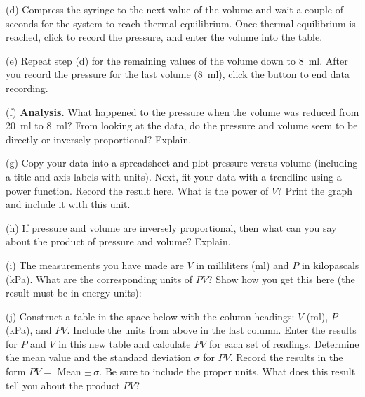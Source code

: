 (d) Compress the syringe to the next value of the volume 
and wait a couple of seconds for the system to reach thermal equilibrium. Once 
thermal equilibrium is reached, click  to record the pressure, and enter the volume into the table.

(e) Repeat step (d) for the remaining values of the volume down to 8~ml.  After you record
the pressure for the last volume (8~ml), click the  button to end data recording.

(f) \textbf{Analysis.} What happened to the pressure when the volume was 
reduced from 20~ml to 8~ml? From looking at the data, do the pressure and 
volume seem to be directly or inversely proportional? Explain.
\vspace{25mm}

(g) Copy your data into a spreadsheet and plot pressure versus volume 
(including a title and axis labels with units). Next, fit your data with a 
trendline using a power function. Record the result here. What is the power of 
$V$? Print the graph and include it with this unit.
\vspace{25mm}

(h) If pressure and volume are inversely proportional, then what can you say
about the product of pressure and volume? Explain.
\vspace{25mm}

\newpage

(i) The measurements you have made are $V$ in milliliters (ml) and $P$ in 
kilopascals (kPa). What are the corresponding units of $PV$? Show how you get 
this here (the result must be in energy units):
\vspace{40mm}

(j) Construct a table in the space below with the column headings: $V$ (ml), $P$
(kPa), and $PV$. Include the units from above in the last column.
Enter the results for $P$ and $V$ in this new table and calculate
$PV$ for each set of readings. Determine the mean value and the standard deviation
$\sigma$ for $PV$. Record the results in the form 
$PV =$ Mean $\pm \, \sigma$. Be sure to include the proper units. 
What does this result tell you about the  product $PV$?

\vspace{12cm}

